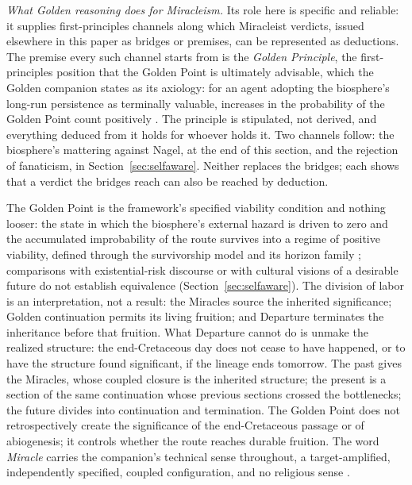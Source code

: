 \emph{What Golden reasoning does for Miracleism.} Its role here is specific
and reliable: it supplies first-principles channels along which Miracleist
verdicts, issued elsewhere in this paper as bridges or premises, can be
represented as deductions. The premise every such channel starts from is the
\emph{Golden Principle}, the first-principles position that the Golden Point
is ultimately advisable, which the Golden companion states as its axiology:
for an agent adopting the biosphere's long-run persistence as terminally
valuable, increases in the probability of the Golden Point count positively
\cite{GoldenReasoning}. The principle is stipulated, not derived, and
everything deduced from it holds for whoever holds it. Two channels follow:
the biosphere's mattering against Nagel, at the end of this section, and the
rejection of fanaticism, in Section~\ref{sec:selfaware}. Neither replaces the
bridges; each shows that a verdict the bridges reach can also be reached by
deduction.

The Golden Point is the framework's specified viability condition and nothing
looser: the state in which the biosphere's external hazard is driven to zero
and the accumulated improbability of the route survives into a regime of
positive viability, defined through the survivorship model and its horizon
family \cite{GoldenSurvivorship,GoldenRouteWorld}; comparisons with
existential-risk discourse or with cultural visions of a desirable future do
not establish equivalence (Section~\ref{sec:selfaware}). The division of
labor is an interpretation, not a result: the Miracles source the inherited
significance; Golden continuation permits
its living fruition; and Departure terminates the inheritance before that
fruition. What Departure cannot do is unmake the realized structure: the
end-Cretaceous day does not cease to have happened, or to have the structure
found significant, if the lineage ends tomorrow. The past gives the Miracles,
whose coupled closure is the inherited structure; the present is a section of
the same continuation whose previous sections crossed the bottlenecks; the
future divides into continuation and termination. The Golden Point does not
retrospectively create the significance of the end-Cretaceous passage or of
abiogenesis; it controls whether the route reaches durable fruition. The word \emph{Miracle} carries the companion's
technical sense throughout, a target-amplified, independently specified,
coupled configuration, and no religious sense \cite{GoldenRouteWorld}.

